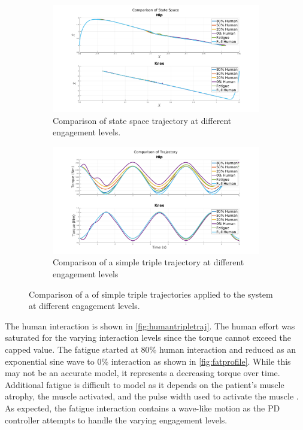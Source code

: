 \begin{figure}
    \centering
    \begin{subfigure}{\linewidth}
        \centering
        \includegraphics[width=\columnwidth]{images/controllers/trajs/statespace.png}
        \caption[State Space Trajectory]{Comparison of state space trajectory at different engagement levels.}
        \label{fig:StateSpaceTrajectory}
    \end{subfigure}
    \begin{subfigure}{\linewidth}
        \centering
        \includegraphics[width=\columnwidth]{images/controllers/trajs/triple_traj.png}
        \caption[Triple Trajectory]{Comparison of a simple triple trajectory at different engagement levels}
        \label{fig:TripleTrajectory}
    \end{subfigure}
    \caption[Triple Trajectory LARRE]{Comparison of a of simple triple trajectories applied to the system at different engagement levels.}
    \label{fig:TripleTraj}
\end{figure}



The human interaction is shown in \autoref{fig:humantripletraj}. The human effort was saturated for the varying interaction levels since the torque cannot exceed the capped value. The fatigue started at 80\% human interaction and reduced as an exponential sine wave to 0\% interaction as shown in \autoref{fig:fatprofile}. While this may not be an accurate model, it represents a decreasing torque over time. Additional fatigue is difficult to model as it depends on the patient's muscle atrophy, the muscle activated, and the pulse width used to activate the muscle \cite{reiner1998patient}. As expected, the fatigue interaction contains a wave-like motion as the PD controller attempts to handle the varying engagement levels. 


